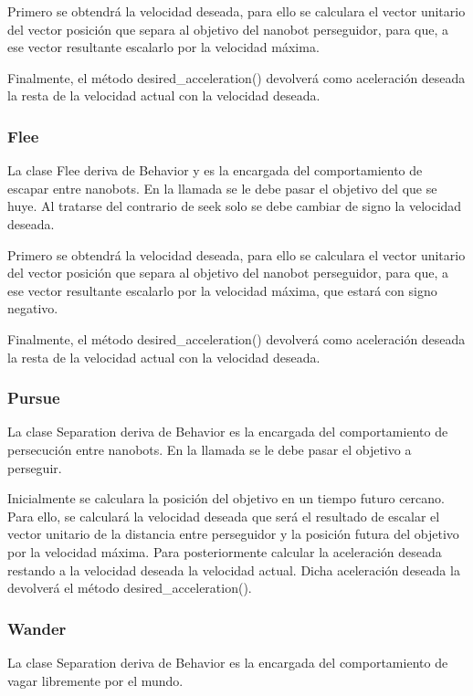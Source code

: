 Primero se obtendrá la velocidad deseada, para ello se calculara el vector unitario del vector posición que separa al objetivo del nanobot perseguidor, para que, a ese vector resultante escalarlo por la  velocidad máxima.

Finalmente, el método desired\_acceleration() devolverá como aceleración deseada la resta de la velocidad actual con la velocidad deseada.

\subsubsection{Flee}
\label{sec:flee}
La clase Flee deriva de Behavior y es la encargada del comportamiento de escapar entre nanobots. En la llamada se le debe pasar el objetivo del que se huye. Al tratarse del contrario de seek solo se debe cambiar de signo la velocidad deseada.

Primero se obtendrá la velocidad deseada, para ello se calculara el vector unitario del vector posición que separa al objetivo del nanobot perseguidor, para que, a ese vector resultante escalarlo por la  velocidad máxima, que estará con signo negativo.

Finalmente, el método desired\_acceleration() devolverá como aceleración deseada la resta de la velocidad actual con la velocidad deseada.

\subsubsection{Pursue}
\label{sec:pursue}
La clase Separation deriva de Behavior es la encargada del comportamiento de persecución entre nanobots.  En la llamada se le debe pasar el objetivo a perseguir.

Inicialmente se calculara la posición del objetivo en un tiempo futuro cercano. Para ello, se calculará la velocidad deseada que será el resultado de escalar el vector unitario de la distancia entre perseguidor y la posición futura del objetivo por la velocidad máxima. Para posteriormente calcular la aceleración deseada restando a la velocidad deseada la velocidad actual. Dicha aceleración deseada la devolverá el método desired\_acceleration().



\subsubsection{Wander}
\label{sec:wander}
La clase Separation deriva de Behavior es la encargada del comportamiento de vagar libremente por el mundo.

